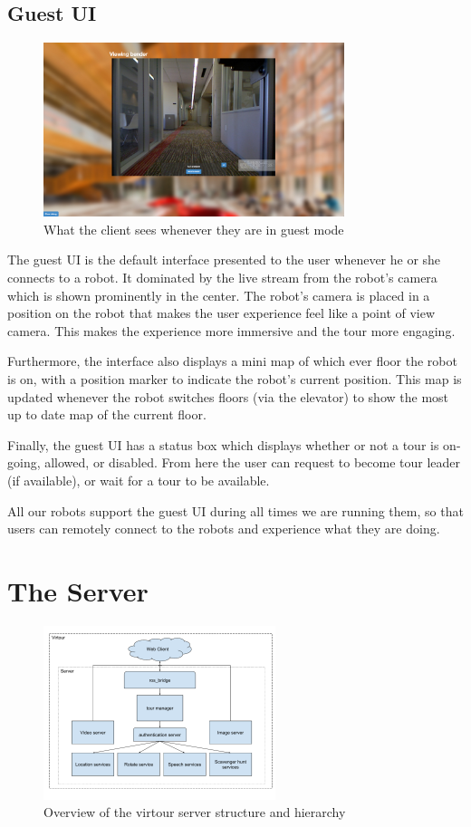 \documentclass{sig-alternate-05-2015}
\begin{document}
\subsection{Guest UI}

\begin{figure}
\centering
\includegraphics[height=2in]{guestUI}
\caption{What the client sees whenever they are in guest mode}
\end{figure}

The guest UI is the default interface presented to the user whenever he or she
connects to a robot. It dominated by the live stream from the robot's camera
which is shown prominently in the center. The robot's camera is placed in a
position on the robot that makes the user experience feel like a point of view
camera. This makes the experience more immersive and the tour more engaging.

Furthermore, the interface also displays a mini map of which ever floor the
robot is on, with a position marker to indicate the robot's current position.
This map is updated whenever the robot switches floors (via the elevator) to
show the most up to date map of the current floor.

Finally, the guest UI has a status box which displays whether or not a tour is
on-going, allowed, or disabled. From here the user can request to become tour
leader (if available), or wait for a tour to be available.

All our robots support the guest UI during all times we are running them, so
that users can remotely connect to the robots and experience what they are
doing.

\section{The Server}

\begin{figure}
\centering
\includegraphics[height=2in]{virtour_server}
\caption{Overview of the virtour server structure and hierarchy}
\end{figure}
\end{document}
